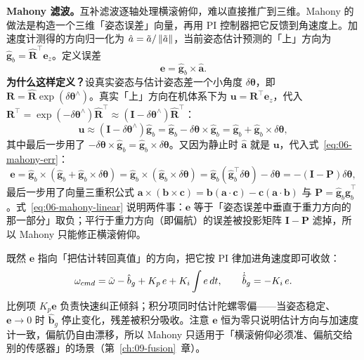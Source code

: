 \textbf{Mahony 滤波。}互补滤波逐轴处理横滚俯仰，难以直接推广到三维。Mahony 的做法是构造一个三维「姿态误差」向量，再用 PI 控制器把它反馈到角速度上。加速度计测得的方向归一化为 $\hat{a}=\tilde{a}/\left\lVert \tilde{a} \right\rVert$，当前姿态估计预测的「上」方向为 $\hat{\bm{g}}_b=\hat{\bm{R}}^{\top}\bm{e}_z$。定义误差
\begin{equation}
  \bm{e} = \hat{\bm{g}}_b\times\hat{\bm{a}}.
  \label{eq:06-mahony-err}
\end{equation}
\textbf{为什么这样定义？}设真实姿态与估计姿态差一个小角度 $\delta\bm{\theta}$，即 $\bm{R}=\hat{\bm{R}}\exp(\delta\bm{\theta}^{\wedge})$。真实「上」方向在机体系下为 $\bm{u}=\bm{R}^{\top}\bm{e}_z$，代入 $\bm{R}^{\top}=\exp(-\delta\bm{\theta}^{\wedge})\hat{\bm{R}}^{\top}\approx(\bm{I}-\delta\bm{\theta}^{\wedge})\hat{\bm{R}}^{\top}$：
\begin{equation}
  \bm{u} \approx \left(\bm{I}-\delta\bm{\theta}^{\wedge}\right)\hat{\bm{g}}_b
  = \hat{\bm{g}}_b - \delta\bm{\theta}\times\hat{\bm{g}}_b
  = \hat{\bm{g}}_b + \hat{\bm{g}}_b\times\delta\bm{\theta},
\end{equation}
其中最后一步用了 $-\delta\bm{\theta}\times\hat{\bm{g}}_b=\hat{\bm{g}}_b\times\delta\bm{\theta}$。又因为静止时 $\hat{\bm{a}}$ 就是 $\bm{u}$，代入式~\eqref{eq:06-mahony-err}：
\begin{equation}
  \bm{e} = \hat{\bm{g}}_b\times\left(\hat{\bm{g}}_b+\hat{\bm{g}}_b\times\delta\bm{\theta}\right)
  = \hat{\bm{g}}_b\times\left(\hat{\bm{g}}_b\times\delta\bm{\theta}\right)
  = \hat{\bm{g}}_b\left(\hat{\bm{g}}_b^{\top}\delta\bm{\theta}\right)-\delta\bm{\theta}
  = -\left(\bm{I}-\bm{P}\right)\delta\bm{\theta},
  \label{eq:06-mahony-linear}
\end{equation}
最后一步用了向量三重积公式 $\bm{a}\times(\bm{b}\times\bm{c})=\bm{b}(\bm{a}\cdot\bm{c})-\bm{c}(\bm{a}\cdot\bm{b})$ 与 $\bm{P}=\hat{\bm{g}}_b\hat{\bm{g}}_b^{\top}$。式~\eqref{eq:06-mahony-linear} 说明两件事：$\bm{e}$ 等于「姿态误差中垂直于重力方向的那一部分」取负；平行于重力方向（即偏航）的误差被投影矩阵 $\bm{I}-\bm{P}$ 滤掉，所以 Mahony 只能修正横滚俯仰。

既然 $\bm{e}$ 指向「把估计转回真值」的方向，把它按 PI 律加进角速度即可收敛：
\begin{equation}
  \omega_{cmd} = \tilde{\omega} - \hat{b}_g + K_p\,e + K_i\int e\,d t,
  \qquad
  \dot{\hat{b}}_g = -K_i\,e.
  \label{eq:06-mahony}
\end{equation}
比例项 $K_p\bm{e}$ 负责快速纠正倾斜；积分项同时估计陀螺零偏——当姿态稳定、$\bm{e}\to0$ 时 $\hat{\bm{b}}_g$ 停止变化，残差被积分吸收。注意 $\bm{e}$ 恒为零只说明估计方向与加速度计一致，偏航仍自由漂移，所以 Mahony 只适用于「横滚俯仰必须准、偏航交给别的传感器」的场景（第~\ref{ch:09-fusion}~章）。

